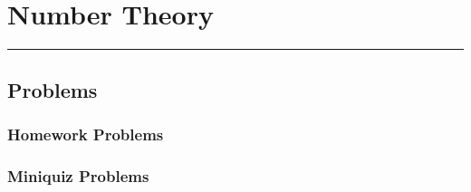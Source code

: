 
\usenotesproblems
\renewcommand{\linput}[1]{}

\chapter{Number Theory}

\instatements{\linput{Section0700}}

\instatements{\linput{Section0701}}
\startclassproblems

\instatements{\linput{Section0702}}
\startclassproblems

\instatements{\linput{Section0703}}
\startclassproblems

\instatements{\linput{Section0704}}
\startclassproblems

\instatements{\linput{Section0705}}
\startclassproblems

\instatements{\linput{Section0706}}
\startclassproblems

\instatements{\linput{Section0707}}
\startclassproblems

\instatements{\linput{Section0708}}

\rule{\textwidth}{0.01in}\par
\nointerlineskip
\section{Problems}

\subsection*{Homework Problems}
\clearpage

\subsection*{Miniquiz Problems}
\clearpage

\endinput